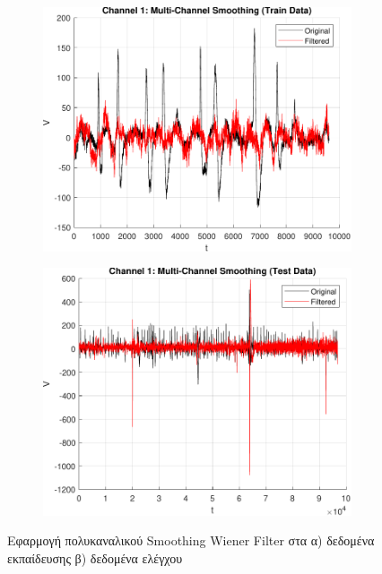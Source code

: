 \documentclass[a4paper,12pt]{article}
\begin{document}
\begin{figure}[htbp]
    \centering
    \begin{subfigure}[b]{0.45\textwidth}
        \includegraphics[width=\textwidth]{plot/multi_channel_smoothing_train.pdf}
        \caption{}
        \label{fig:multi_channel_smoothing_train}
    \end{subfigure}
    \hfill
    \begin{subfigure}[b]{0.45\textwidth}
        \includegraphics[width=\textwidth]{plot/multi_channel_smoothing_test.pdf}
        \caption{}
        \label{fig:multi_channel_smoothing_test}
    \end{subfigure}

    \caption{Εφαρμογή πολυκαναλικού Smoothing Wiener Filter 
    στα α) δεδομένα εκπαίδευσης β) δεδομένα ελέγχου}
    \label{fig:multi_channel_smoothing}
\end{figure}
\end{document}
